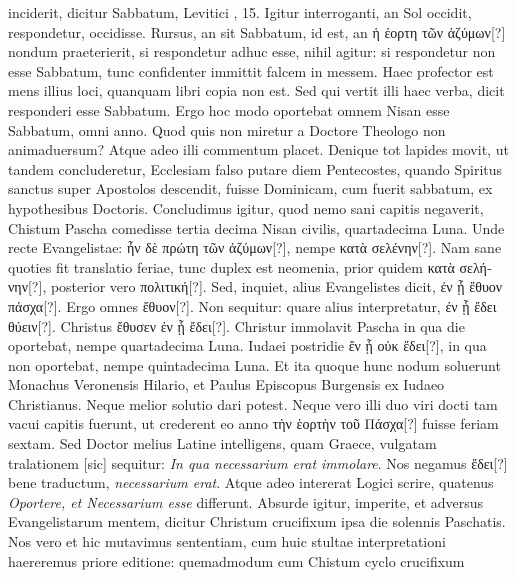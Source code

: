 inciderit, dicitur Sabbatum, Levitici , 15.
Igitur interroganti,
an Sol occidit, respondetur, occidisse.
Rursus, an sit Sabbatum, id
est, an \textgreek{ἡ έορτη τῶν ἀζύμων[?]} nondum praeterierit,
 si respondetur adhuc
esse, nihil agitur: si respondetur non esse Sabbatum, tunc confidenter
immittit falcem in messem.
Haec profector est mens illius loci,
quanquam libri copia non est.
Sed qui vertit illi haec verba, dicit responderi
esse Sabbatum.
Ergo hoc modo oportebat omnem 
Nisan esse Sabbatum, omni anno.
Quod quis non miretur a Doctore
Theologo non animaduersum?
Atque adeo illi commentum
placet.
Denique tot lapides movit, ut tandem concluderetur, Ecclesiam
falso putare diem Pentecostes, quando Spiritus sanctus super
Apostolos descendit, fuisse Dominicam, cum fuerit sabbatum, ex
hypothesibus Doctoris.
Concludimus igitur, quod nemo sani capitis
negaverit, Chistum Pascha comedisse tertia decima Nisan civilis,
quartadecima Luna.
Unde recte Evangelistae: \textgreek{ἦν δὲ πρώτη τῶν
ἀζύμων[?]}, nempe \textgreek{κατὰ σελένην[?]}.
Nam sane quoties fit translatio feriae,
tunc duplex est neomenia, prior quidem \textgreek{κατὰ σελήνην[?]},
 posterior vero
\textgreek{πολιτική[?]}.
Sed, inquiet, alius Evangelistes dicit, \textgreek{ἐν ᾗ ἔθυον πάσχα[?]}.
Ergo omnes \textgreek{ἔθυον[?]}.
Non sequitur: quare alius interpretatur, \textgreek{ἐν ᾗ ἔδει θύειν[?]}.
Christus \textgreek{ἔθυσεν ἐν ᾗ ἔδει[?]}.
Christur immolavit Pascha in qua die
oportebat, nempe quartadecima Luna.
Iudaei postridie \textgreek{ἔν ᾗ οὐκ ἔδει[?]},
in qua non oportebat, nempe quintadecima Luna.
Et ita quoque
hunc nodum soluerunt Monachus Veronensis Hilario, et Paulus
Episcopus Burgensis ex Iudaeo Christianus.
Neque melior solutio
dari potest.
Neque vero illi duo viri docti tam vacui capitis fuerunt,
ut crederent eo anno \textgreek{τὴν ἑορτὴν τοῦ Πάσχα[?]} fuisse feriam sextam.
Sed Doctor melius Latine intelligens, quam Graece,
 vulgatam tralationem [sic]
sequitur: \textit{In qua necessarium erat immolare}.
Nos negamus
\textgreek{ἔδει[?]} bene traductum, \textit{necessarium erat}.
Atque adeo intererat Logici
scrire, quatenus \textit{Oportere, et Necessarium esse} differunt.
Absurde igitur, imperite, et adversus Evangelistarum mentem, dicitur
Christum crucifixum ipsa die solennis Paschatis.
Nos vero et
hic mutavimus sententiam, cum huic stultae interpretationi haereremus
priore editione: quemadmodum cum Chistum cyclo  crucifixum
